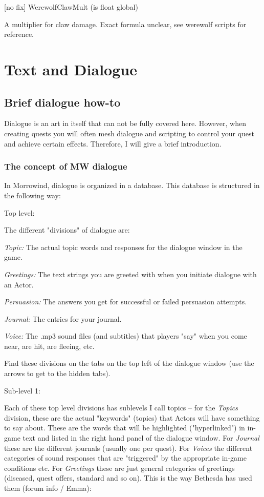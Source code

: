 \documentclass[
]{article}
\begin{document}
{[}no fix{]} WerewolfClawMult (is float global)

A multiplier for claw damage. Exact formula unclear, see werewolf
scripts for reference.

\hypertarget{text-and-dialogue}{%
\section{\texorpdfstring{\hfill\break
Text and Dialogue}{ Text and Dialogue}}\label{text-and-dialogue}}

\hypertarget{brief-dialogue-how-to}{%
\subsection{Brief dialogue how-to}\label{brief-dialogue-how-to}}

Dialogue is an art in itself that can not be fully covered here.
However, when creating quests you will often mesh dialogue and scripting
to control your quest and achieve certain effects. Therefore, I will
give a brief introduction.

\hypertarget{the-concept-of-mw-dialogue}{%
\subsubsection{The concept of MW
dialogue}\label{the-concept-of-mw-dialogue}}

In Morrowind, dialogue is organized in a database. This database is
structured in the following way:

Top level:

The different "divisions" of dialogue are:

\emph{Topic:} The actual topic words and responses for the dialogue
window in the game.

\emph{Greetings:} The text strings you are greeted with when you
initiate dialogue with an Actor.

\emph{Persuasion:} The answers you get for successful or failed
persuasion attempts.

\emph{Journal:} The entries for your journal.

\emph{Voice:} The .mp3 sound files (and subtitles) that players "say"
when you come near, are hit, are fleeing, etc.

Find these divisions on the tabs on the top left of the dialogue window
(use the arrows to get to the hidden tabs).

Sub-level 1:

Each of these top level divisions has sublevels I call topics -- for the
\emph{Topics} division, these are the actual "keywords" (topics) that
Actors will have something to say about. These are the words that will
be highlighted ("hyperlinked") in in-game text and listed in the right
hand panel of the dialogue window. For \emph{Journal} these are the
different journals (usually one per quest). For \emph{Voices} the
different categories of sound responses that are "triggered" by the
appropriate in-game conditions etc. For \emph{Greetings} these are just
general categories of greetings (diseased, quest offers, standard and so
on). This is the way Bethesda has used them (forum info / Emma):
\end{document}
